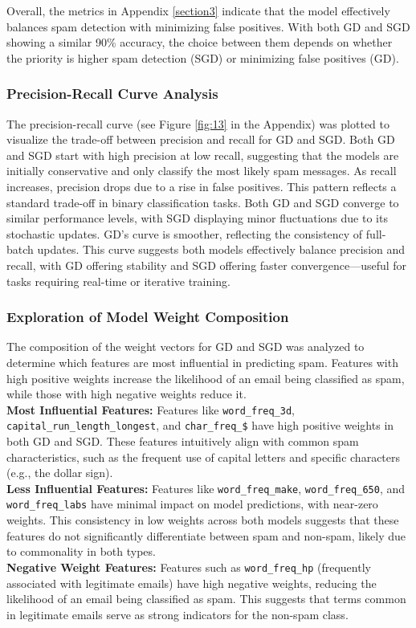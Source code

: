 \documentclass[a4paper,oneside,bibliography=totoc]{scrartcl}
\begin{document}
Overall, the metrics in Appendix \ref{section3} indicate that the model effectively balances spam detection with minimizing false positives. With both GD and SGD showing a similar 90\% accuracy, the choice between them depends on whether the priority is higher spam detection (SGD) or minimizing false positives (GD).

\subsubsection{Precision-Recall Curve Analysis}
The precision-recall curve (see Figure \ref{fig:13} in the Appendix) was plotted to visualize the trade-off between precision and recall for GD and SGD. Both GD and SGD start with high precision at low recall, suggesting that the models are initially conservative and only classify the most likely spam messages. As recall increases, precision drops due to a rise in false positives. This pattern reflects a standard trade-off in binary classification tasks. Both GD and SGD converge to similar performance levels, with SGD displaying minor fluctuations due to its stochastic updates. GD’s curve is smoother, reflecting the consistency of full-batch updates.
This curve suggests both models effectively balance precision and recall, with GD offering stability and SGD offering faster convergence—useful for tasks requiring real-time or iterative training.

\subsubsection{Exploration of Model Weight Composition}
The composition of the weight vectors for GD and SGD was analyzed to determine which features are most influential in predicting spam. Features with high positive weights increase the likelihood of an email being classified as spam, while those with high negative weights reduce it.\\
\textbf{Most Influential Features:} Features like \texttt{word\_freq\_3d},
    \texttt{capital\_run\_length\_longest}, and \texttt{char\_freq\_\$} have high positive weights in both GD and SGD. These features intuitively align with common spam characteristics, such as the frequent use of capital letters and specific characters (e.g., the dollar sign).\\
 \textbf{Less Influential Features:} Features like \texttt{word\_freq\_make}, \texttt{word\_freq\_650}, and \\ \texttt{word\_freq\_labs} have minimal impact on model predictions, with near-zero weights. This consistency in low weights across both models suggests that these features do not significantly differentiate between spam and non-spam, likely due to commonality in both types.\\
\textbf{Negative Weight Features:} Features such as \texttt{word\_freq\_hp} (frequently associated with legitimate emails) have high negative weights, reducing the likelihood of an email being classified as spam. This suggests that terms common in legitimate emails serve as strong indicators for the non-spam class.
\end{document}
